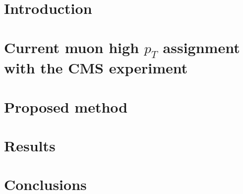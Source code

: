 \documentclass[a4paper,11pt]{article}
\begin{document}
\section{Introduction}



\section{Current muon high $p_{T}$ assignment with the CMS experiment}\label{current_assignment}



\section{Proposed method}\label{method}



\section{Results}\label{results}



\section{Conclusions}\label{conclusions}





\end{document}
